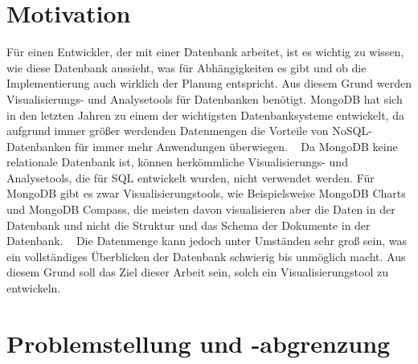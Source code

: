 \iffalse
Die Einleitung dient dazu, beim Leser Interesse für die Inhalte 
Praxissemesterberichts zu wecken, die behandelten Probleme aufzuzeigen 
und die zu ihrer Lösung entwickelten Konzepte zu beschreiben.
\fi

\section{Motivation}
\label{sec:motivation}

\iffalse
In der Motivation wird dargestellt, welche Bedeutung die im 
Praxissemester zu entwickelnden Lösungen für das betreuende Unternehmen 
haben. Es wird beispielsweise aufzeigt, in welches Produkt sie eingehen, 
welcher Ablauf verbessert werden soll etc.
\fi

Für einen Entwickler, der mit einer Datenbank arbeitet, ist es wichtig zu wissen, wie diese Datenbank aussieht, was für Abhängigkeiten es gibt und ob die Implementierung auch wirklich der Planung entspricht.
Aus diesem Grund werden Visualisierungs- und Analysetools für Datenbanken benötigt.
MongoDB hat sich in den letzten Jahren zu einem der wichtigsten Datenbanksysteme entwickelt, da aufgrund immer größer werdenden Datenmengen die Vorteile von NoSQL-Datenbanken für immer mehr Anwendungen überwiegen.
~\autocite{db-engines:mongodb}
Da MongoDB keine relationale Datenbank ist, können herkömmliche Visualisierungs- und Analysetools, die für SQL entwickelt wurden, nicht verwendet werden.
Für MongoDB gibt es zwar Visualisierungstools, wie Beispielsweise MongoDB Charts und MongoDB Compass, die meisten davon visualisieren aber die Daten in der Datenbank und nicht die Struktur und das Schema der Dokumente in der Datenbank.
~\autocite{knowi:mongo_vis_tools}
Die Datenmenge kann jedoch unter Umständen sehr groß sein, was ein vollständiges Überblicken der Datenbank schwierig bis unmöglich macht.
Aus diesem Grund soll das Ziel dieser Arbeit sein, solch ein Visualisierungstool zu entwickeln.

\section{Problemstellung und -abgrenzung}
\label{sec:problemstellung}

\iffalse
Die Problemstellung dient dazu, das zu lösende Problem klar zu 
definieren und abzugrenzen. Der Praktikant soll ein klares Verständnis 
des zu lösenden Problems haben. Insbesondere soll auch verhindert 
werden, dass zu viele Probleme gleichzeitig angegangen werden. Eine 
Negativabgrenzung verhindert, dass beim Leser später nicht erfüllte 
Erwartungen geweckt werden.
\fi

